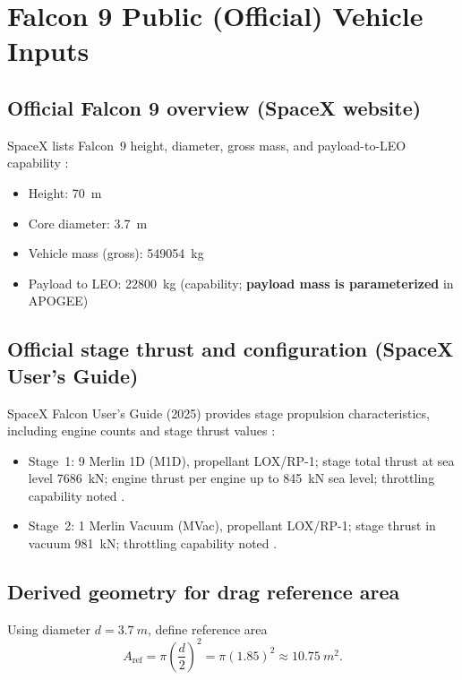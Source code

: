 \documentclass[11pt]{article}
\begin{document}
\section{Falcon 9 Public (Official) Vehicle Inputs}
\subsection{Official Falcon 9 overview (SpaceX website)}
SpaceX lists Falcon~9 height, diameter, gross mass, and payload-to-LEO capability \cite{SpaceX_F9_Web}:
\begin{itemize}
\item Height: \SI{70}{m}
\item Core diameter: \SI{3.7}{m}
\item Vehicle mass (gross): \SI{549054}{kg}
\item Payload to LEO: \SI{22800}{kg} (capability; \textbf{payload mass is parameterized} in APOGEE)
\end{itemize}

\subsection{Official stage thrust and configuration (SpaceX User's Guide)}
SpaceX Falcon User's Guide (2025) provides stage propulsion characteristics, including engine counts and stage thrust values \cite{SpaceX_UsersGuide_2025}:
\begin{itemize}
\item Stage~1: 9 Merlin 1D (M1D), propellant LOX/RP-1; stage total thrust at sea level \SI{7686}{kN}; engine thrust per engine up to \SI{845}{kN} sea level; throttling capability noted \cite{SpaceX_UsersGuide_2025}.
\item Stage~2: 1 Merlin Vacuum (MVac), propellant LOX/RP-1; stage thrust in vacuum \SI{981}{kN}; throttling capability noted \cite{SpaceX_UsersGuide_2025}.
\end{itemize}

\subsection{Derived geometry for drag reference area}
Using diameter $d=\SI{3.7}{m}$, define reference area
\begin{equation}
A_{\text{ref}}=\pi\left(\frac{d}{2}\right)^2=\pi(1.85)^2\approx \SI{10.75}{m^2}.
\end{equation}
\end{document}
